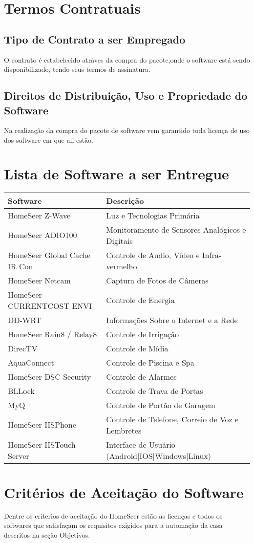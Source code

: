 \section{Termos Contratuais}

\subsection{Tipo de Contrato a ser Empregado}
O contrato é estabelecido atráves da compra do pacote,onde o software está sendo disponibilizado,
tendo seus termos de assinatura.

\subsection{Direitos de Distribuição, Uso e Propriedade do Software}
Na realização da compra do pacote de software vem garantido toda licença de uso dos software em que ali estão.

\section{Lista de Software a ser Entregue}

\begin{tabular}{|l|l|}
\hline
\textbf{Software} & \textbf{Descrição}\tabularnewline
\hline
\hline
HomeSeer Z-Wave & Luz e Tecnologias Primária\tabularnewline
\hline
HomeSeer ADIO100 & Monitoramento de Sensores Analógicos e Digitais\tabularnewline
\hline
HomeSeer Global Cache IR Con & Controle de Audio, Vídeo e Infra-vermelho\tabularnewline
\hline
HomeSeer Netcam & Captura de Fotos de Câmeras\tabularnewline
\hline
HomeSeer CURRENTCOST ENVI & Controle de Energia\tabularnewline
\hline
DD-WRT & Informações Sobre a Internet e a Rede\tabularnewline
\hline
HomeSeer Rain8 / Relay8 & Controle de Irrigação\tabularnewline
\hline
DirecTV & Controle de Mídia\tabularnewline
\hline
AquaConnect & Controle de Piscina e Spa\tabularnewline
\hline
HomeSeer DSC Security & Controle de Alarmes\tabularnewline
\hline
BLLock & Controle de Trava de Portas\tabularnewline
\hline
MyQ & Controle de Portão de Garagem\tabularnewline
\hline
HomeSeer HSPhone & Controle de Telefone, Correio de Voz e Lembretes\tabularnewline
\hline
HomeSeer HSTouch Server & Interface de Usuário (Android|IOS|Windows|Linux)\tabularnewline
\hline
\end{tabular}

\section{Critérios de Aceitação do Software}
Dentre os críterios de aceitação do HomeSeer estão as licenças e todos os softwares que satisfaçam os requisitos
exigidos para a automação da casa descritos na seção Objetivos.
